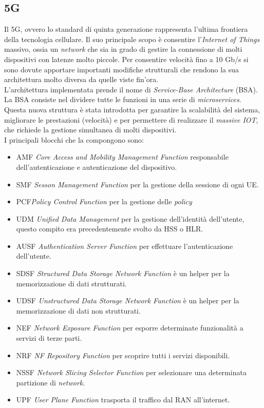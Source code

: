 \clearpage

\subsection{5G}
Il 5G, ovvero lo standard di quinta generazione rappresenta l'ultima frontiera della tecnologia cellulare.
Il suo principale scopo è consentire l'\textit{Internet of Things} massivo, ossia un \textit{network} che sia 
in grado di gestire la connessione di molti dispositivi con latenze molto piccole.
Per consentire velocità fino a 10 Gb/s si sono
dovute apportare importanti modifiche strutturali che rendono la sua architettura molto diversa da quelle viste fin'ora.\\
L'architettura implementata prende il nome di \textit{Service-Base Architecture} (BSA).
La BSA consiste nel dividere tutte le funzioni in una serie di \textit{microservices}\cite{5g-approach}. 
Questa nuova struttura è stata introdotta per garantire la scalabilità del sistema, migliorare le prestazioni (velocità) e per 
permettere di realizzare il \textit{massive IOT}, che richiede la gestione simultanea di molti dispositivi.\\
I principali blocchi che la compongono sono:
\begin{itemize}
    \item AMF \textit{Core Access and Mobility Management Function} responsabile dell'autenticazione e autenticazione del dispositivo.
    \item SMF \textit{Sesson Management Function} per la gestione della sessione di ogni UE.
    \item PCF\textit{Policy Control Function} per la gestione delle \textit{policy}
    \item UDM \textit{Unified Data Management} per la gestione dell'identità dell'utente, questo compito era precedentemente svolto da HSS o HLR.
    \item AUSF \textit{Authentication Server Function} per effettuare l'autenticazione dell'utente.
    \item SDSF \textit{Structured Data Storage Network Function} è un helper per la memorizzazione di dati strutturati.
    \item UDSF \textit{Unstructured Data Storage Network Function} è un helper per la memorizzazione di dati non strutturati.
    \item NEF \textit{Network Exposure Function} per esporre determinate funzionalità a servizi di terze parti.
    \item NRF \textit{NF Repository Function} per scoprire tutti i servizi disponibili.
    \item NSSF \textit{Network Slicing Selector Function} per selezionare una determinata partizione di \textit{network}.
    \item UPF \textit{User Plane Function} trasporta il traffico dal RAN all'internet.
\end{itemize}
